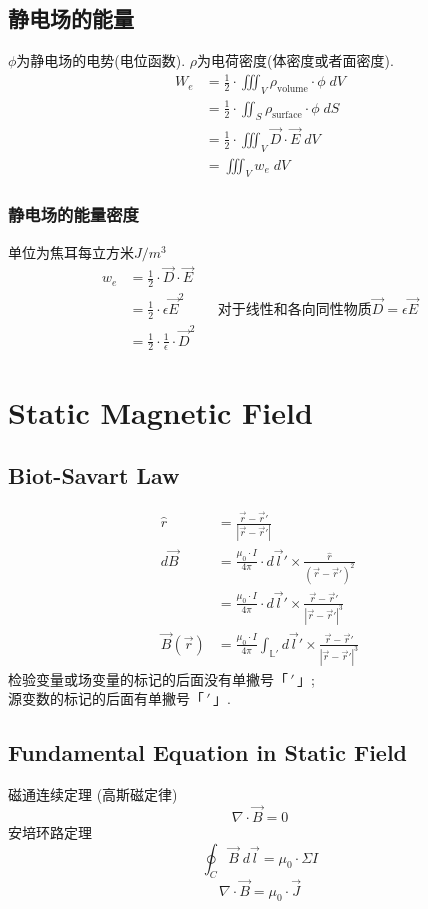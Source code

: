 \documentclass[a4paper]{report}
\begin{document}
\section{静电场的能量}
$\phi$为静电场的电势(电位函数). $\rho$为电荷密度(体密度或者面密度). 
\begin{align*}
    W_e&=\frac{1}{2}\cdot \iiint_V \rho_{\text{volume}} \cdot \phi \; dV\\
    &=\frac{1}{2}\cdot \iint_S \rho_{\text{surface}} \cdot \phi \; dS\\
    &=\frac{1}{2}\cdot \iiint_V \vec{D}\cdot \vec{E}\; dV  \\
    &=\iiint_V w_e  \; dV
\end{align*}
\subsection{静电场的能量密度}
\label{sec:energy_e}
单位为焦耳每立方米$J/m^3$
\begin{align*}
    w_e&=\frac{1}{2}\cdot \vec{D}\cdot\vec{E}\\
    &=\frac{1}{2}\cdot \epsilon\vec{E}^2 &&\text{对于线性和各向同性物质$\vec{D}=\epsilon\vec{E}$}\\
    &=\frac{1}{2}\cdot \frac{1}{\epsilon}\cdot\vec{D}^2
\end{align*}


\chapter{Static Magnetic Field}
\section{Biot-Savart Law}
\begin{align*}
    \hat{r}&=\frac{\vec{r}-\vec{r}'}{|\vec{r}-\vec{r}'|}\\
    d\vec{B}&=\frac{\mu_0\cdot I}{4\pi}\cdot d\vec{l}'\times\frac{\hat{r}}{(\vec{r}-\vec{r}')^2}\\
    &=\frac{\mu_0\cdot I}{4\pi}\cdot d\vec{l}'\times \frac{\vec{r}-\vec{r}'}{|\vec{r}-\vec{r}'|^3}\\
    \vec{B}(\vec{r})&=\frac{\mu_0\cdot I}{4\pi} \int_\mathbb{L'} d\vec{l}'\times \frac{\vec{r}-\vec{r}'}{|\vec{r}-\vec{r}'|^3}
\end{align*}
检验变量或场变量的标记的后面没有单撇号「${\,\!}'\,\!$」;\\源变数的标记的后面有单撇号「${\,\!}'\,\!$」. \\
\section{Fundamental Equation in Static Field}
磁通连续定理 (高斯磁定律)
$$\nabla\cdot \vec{B}=0 $$
安培环路定理
$$\oint_C \vec{B}  \; d\vec{l}=\mu_0\cdot\Sigma I$$
$$\nabla\cdot \vec{B}=\mu_0\cdot\vec{J} $$
\end{document}
